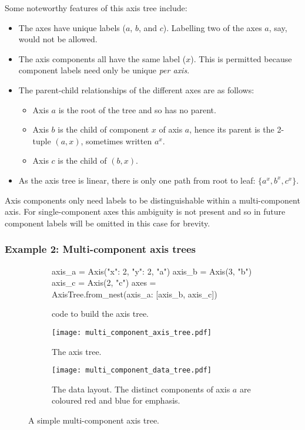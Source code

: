 \documentclass[thesis]{subfiles}
\begin{document}
Some noteworthy features of this axis tree include:
\begin{itemize}
  \item
    The axes have unique labels ($a$, $b$, and $c$).
    Labelling two of the axes $a$, say, would not be allowed.

  \item
    The axis components all have the same label ($x$).
    This is permitted because component labels need only be unique \emph{per axis}.

  \item
    The parent-child relationships of the different axes are as follows:
    \begin{itemize}
      \item Axis $a$ is the root of the tree and so has no parent.
      \item Axis $b$ is the child of component $x$ of axis $a$, hence its parent is the 2-tuple $(a, x)$, sometimes written $a^x$.
      \item Axis $c$ is the child of $(b, x)$.
    \end{itemize}

  \item
    As the axis tree is linear, there is only one path from root to leaf: $\{ a^x, b^x, c^x \}$.
\end{itemize}

Axis components only need labels to be distinguishable within a multi-component axis.
For single-component axes this ambiguity is not present and so in future component labels will be omitted in this case for brevity.

\subsubsection{Example 2: Multi-component axis trees}

\begin{figure}
  \centering
  \begin{subfigure}{.9\textwidth}
    \begin{pyalg2}
      axis_a = Axis({"x": 2, "y": 2}, "a")
      axis_b = Axis(3, "b")
      axis_c = Axis(2, "c")
      axes = AxisTree.from_nest({axis_a: [axis_b, axis_c]})
    \end{pyalg2}
    \caption{ code to build the axis tree.}
  \end{subfigure}

  \vspace{1em}

  \begin{subfigure}{.4\textwidth}
    \centering
    \texttt{[image: multi\_component\_axis\_tree.pdf]}
    \caption{The axis tree.}
  \end{subfigure}
  \begin{subfigure}{.4\textwidth}
    \centering
    \texttt{[image: multi\_component\_data\_tree.pdf]}
    \caption{
      The data layout.
      The distinct components of axis $a$ are coloured red and blue for emphasis.
    }
    \label{fig:multi_component_data_tree}
  \end{subfigure}
  \caption{
    A simple multi-component axis tree.
  }
  \label{fig:multi_component_axis_tree_intro}
\end{figure}
\end{document}
